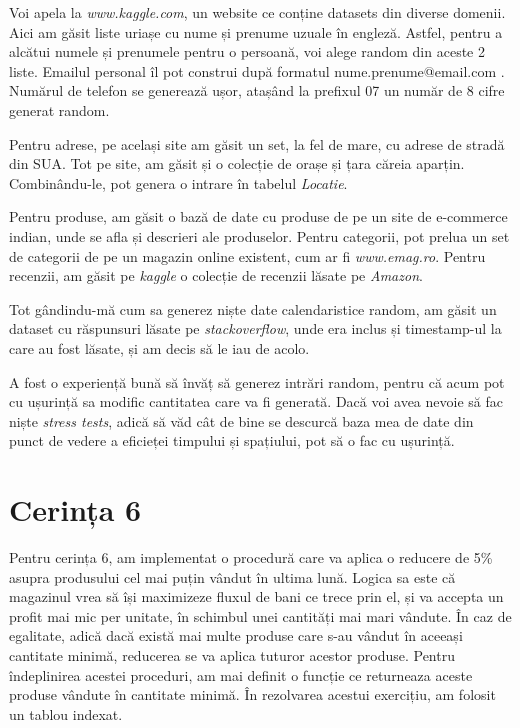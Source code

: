 \documentclass[12pt]{article}
\begin{document}
Voi apela la \textit{www.kaggle.com}, un website ce conține datasets din diverse domenii. Aici am găsit liste uriașe
cu nume și prenume uzuale în engleză. Astfel, pentru a alcătui numele și prenumele pentru o persoană, voi alege random 
din aceste 2 liste. Emailul personal îl pot construi după formatul nume.prenume@email.com . Numărul de telefon 
se generează ușor, atașând la prefixul 07 un număr de 8 cifre generat random.

Pentru adrese, pe același site am găsit un set, la fel de mare, cu adrese de stradă din SUA. Tot pe site, am
găsit și o colecție de orașe și țara căreia aparțin. Combinându-le, pot genera o intrare în tabelul \textit{Locatie}.

Pentru produse, am găsit o bază de date cu produse de pe un site de e-commerce indian, unde se afla și 
descrieri ale produselor. Pentru categorii, pot prelua un set de categorii de pe un magazin online existent, 
cum ar fi \textit{www.emag.ro}. Pentru recenzii, am găsit pe \textit{kaggle} o colecție de recenzii lăsate pe \textit{Amazon}.

Tot gândindu-mă cum sa generez niște date calendaristice random, am găsit un dataset cu răspunsuri lăsate pe
\textit{stackoverflow}, unde era inclus și timestamp-ul la care au fost lăsate, și am decis să le iau de acolo.


A fost o experiență bună să învăț să generez intrări random, pentru că acum pot cu ușurință sa modific cantitatea care
va fi generată. Dacă voi avea nevoie să fac niște \textit{stress tests}, adică să văd cât de bine se descurcă
baza mea de date din punct de vedere a eficieței timpului și spațiului, pot să o fac cu ușurință.

\pagebreak

\section{Cerința 6}
Pentru cerința 6, am implementat o procedură care va aplica o reducere de 5\% asupra produsului
cel mai puțin vândut în ultima lună. Logica sa este că magazinul vrea să își maximizeze fluxul de bani 
ce trece prin el, și va accepta un profit mai mic per unitate, în schimbul unei cantități mai mari vândute.
În caz de egalitate, adică dacă există mai multe produse care s-au vândut în aceeași cantitate minimă,
reducerea se va aplica tuturor acestor produse.
Pentru îndeplinirea acestei proceduri, am mai definit o funcție ce returneaza aceste produse vândute în cantitate 
minimă. În rezolvarea acestui exercițiu, am folosit un tablou indexat.
\end{document}
